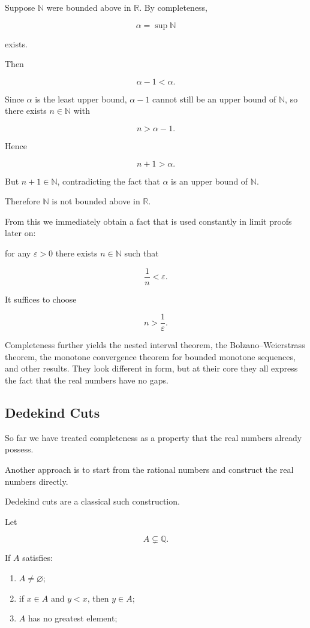 \documentclass[11pt]{article}
\begin{document}
Suppose $\mathbb{N}$ were bounded above in $\mathbb{R}$. By completeness,

\[
\alpha=\sup\mathbb{N}
\]

exists.

Then

\[
\alpha-1<\alpha.
\]

Since $\alpha$ is the least upper bound, $\alpha-1$ cannot still be an upper bound of $\mathbb{N}$, so there exists $n\in\mathbb{N}$ with

\[
n>\alpha-1.
\]

Hence

\[
n+1>\alpha.
\]

But $n+1\in\mathbb{N}$, contradicting the fact that $\alpha$ is an upper bound of $\mathbb{N}$.

Therefore $\mathbb{N}$ is not bounded above in $\mathbb{R}$.

From this we immediately obtain a fact that is used constantly in limit proofs later on:

for any $\varepsilon>0$ there exists $n\in\mathbb{N}$ such that

\[
\frac{1}{n}<\varepsilon.
\]

It suffices to choose

\[
n>\frac{1}{\varepsilon}.
\]

Completeness further yields the nested interval theorem, the Bolzano--Weierstrass theorem, the monotone convergence theorem for bounded monotone sequences, and other results. They look different in form, but at their core they all express the fact that the real numbers have no gaps.

\subsection{Dedekind Cuts}

So far we have treated completeness as a property that the real numbers already possess.

Another approach is to start from the rational numbers and construct the real numbers directly.

Dedekind cuts are a classical such construction.

Let

\[
A\subsetneq\mathbb{Q}.
\]

If $A$ satisfies:

\begin{enumerate}
  \item $A\ne\varnothing$;
  \item if $x\in A$ and $y<x$, then $y\in A$;
  \item $A$ has no greatest element;
\end{enumerate}
\end{document}
